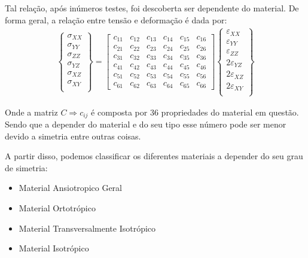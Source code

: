 \documentclass{article}
\begin{document}
Tal relação, após inúmeros testes, foi descoberta ser dependente do material. De forma geral, a relação entre tensão e deformação é dada por:
\begin{align*}
    \begin{Bmatrix}
        \sigma_{XX} \\
        \sigma_{YY} \\
        \sigma_{ZZ} \\
        \sigma_{YZ} \\
        \sigma_{XZ} \\
        \sigma_{XY} \\
    \end{Bmatrix} =
    \begin{bmatrix}
        c_{11} & c_{12} & c_{13} & c_{14} & c_{15} & c_{16} \\
        c_{21} & c_{22} & c_{23} & c_{24} & c_{25} & c_{26} \\
        c_{31} & c_{32} & c_{33} & c_{34} & c_{35} & c_{36} \\
        c_{41} & c_{42} & c_{43} & c_{44} & c_{45} & c_{46} \\
        c_{51} & c_{52} & c_{53} & c_{54} & c_{55} & c_{56} \\
        c_{61} & c_{62} & c_{63} & c_{64} & c_{65} & c_{66}
    \end{bmatrix}
    \begin{Bmatrix}
        \varepsilon_{XX}  \\
        \varepsilon_{YY}  \\
        \varepsilon_{ZZ}  \\
        2\varepsilon_{YZ} \\
        2\varepsilon_{XZ} \\
        2\varepsilon_{XY} \\
    \end{Bmatrix}
\end{align*}

Onde a matriz $C\Rightarrow c_{ij}$ é composta por 36 propriedades do material em questão. Sendo que a depender do material e do seu tipo esse número pode ser menor devido a simetria entre outras coisas.

A partir disso, podemos classificar os diferentes materiais a depender do seu grau de simetria:
\begin{itemize}
    \item Material Ansiotropico Geral
    \item Material Ortotrópico
    \item Material Transversalmente Isotrópico
    \item Material Isotrópico
\end{itemize}
\end{document}
